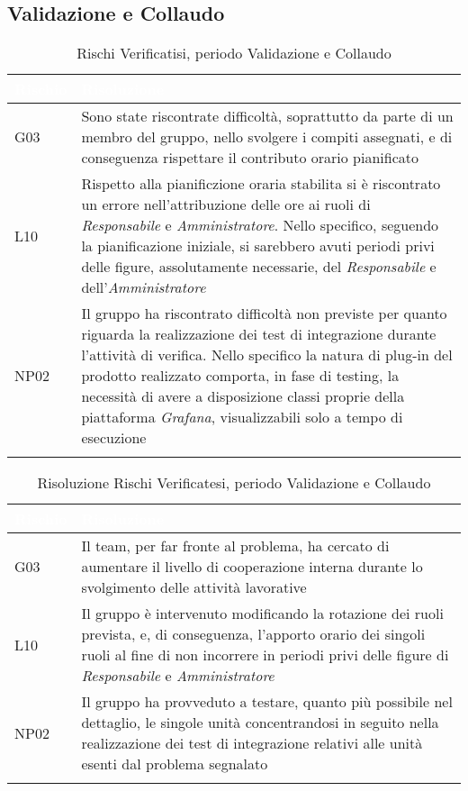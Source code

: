 \subsection{Validazione e Collaudo}\label{ARCollaudo}
\begin{longtable}{|C{.15\textwidth}|C{.79\textwidth}|}
	\hline
	\textbf{\textcolor{white}{Rischio}} & \textbf{\textcolor{white}{Risoluzione}} \\
	\hline \hline
	\endfirsthead
	G03 & Sono state riscontrate difficoltà, soprattutto da parte di un membro del gruppo, nello svolgere i compiti assegnati, e di conseguenza rispettare il contributo orario pianificato\\ 
	\hline
	L10 & Rispetto alla pianificzione oraria stabilita si è riscontrato un errore nell'attribuzione delle ore ai ruoli di \textit{Responsabile} e \textit{Amministratore}. Nello specifico, seguendo la pianificazione iniziale, si sarebbero avuti periodi privi delle figure, assolutamente necessarie, del \textit{Responsabile} e dell'\textit{Amministratore}\\
	\hline
	NP02 & Il gruppo ha riscontrato difficoltà non previste per quanto riguarda la realizzazione dei test di integrazione durante l'attività di verifica. Nello specifico la natura di plug-in del prodotto realizzato comporta, in fase di testing, la necessità di avere a disposizione classi proprie della piattaforma \textit{Grafana}, visualizzabili solo a tempo di esecuzione\\
	\hline
	\caption{Rischi Verificatisi, periodo Validazione e Collaudo}
	\label{tab:analisiRischiRA}
\end{longtable}

\begin{longtable}{|C{.15\textwidth}|C{.79\textwidth}|}
	\hline
	\textbf{\textcolor{white}{Rischio}} & \textbf{\textcolor{white}{Risoluzione}} \\
	\hline \hline
	\endfirsthead
	G03 & Il team, per far fronte al problema, ha cercato di aumentare il livello di cooperazione interna durante lo svolgimento delle attività lavorative\\ 
	\hline
	L10 & Il gruppo è intervenuto modificando la rotazione dei ruoli prevista, e, di conseguenza, l'apporto orario dei singoli ruoli al fine di non incorrere in periodi privi delle figure di \textit{Responsabile} e \textit{Amministratore}\\
	\hline
	NP02 & Il gruppo ha provveduto a testare, quanto più possibile nel dettaglio, le singole unità concentrandosi in seguito nella realizzazione dei test di integrazione relativi alle unità esenti dal problema segnalato\\
	\hline
	\caption{Risoluzione Rischi Verificatesi, periodo Validazione e Collaudo}
	\label{tab:risoluzioneRischiRA}
\end{longtable}

